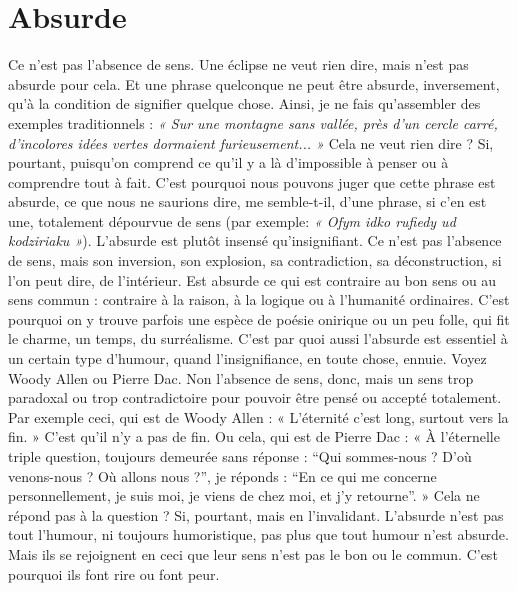 \section{Absurde}
Ce n’est pas l’absence de sens. Une éclipse ne veut rien dire, mais
n'est pas absurde pour cela. Et une phrase quelconque ne peut
être absurde, inversement, qu’à la condition de signifier quelque chose.
Ainsi, je ne fais qu’assembler des exemples traditionnels : {\it « Sur une montagne
sans vallée, près d’un cercle carré, d'incolores idées vertes dormaient
furieusement... »} Cela ne veut rien dire ? Si, pourtant, puisqu'on comprend
ce qu'il y a là d’impossible à penser ou à comprendre tout à fait. C’est pourquoi
nous pouvons juger que cette phrase est absurde, ce que nous ne saurions
dire, me semble-t-il, d’une phrase, si c’en est une, totalement
dépourvue de sens (par exemple: {\it « Ofym idko rufiedy ud kodziriaku »}).
L’absurde est plutôt insensé qu’insignifiant. Ce n’est pas l’absence de sens,
mais son inversion, son explosion, sa contradiction, sa déconstruction, si
l’on peut dire, de l’intérieur. Est absurde ce qui est contraire au bon sens ou
au sens commun : contraire à la raison, à la logique ou à l'humanité ordinaires.
C’est pourquoi on y trouve parfois une espèce de poésie onirique ou
un peu folle, qui fit le charme, un temps, du surréalisme. C’est par quoi
aussi l'absurde est essentiel à un certain type d’humour, quand l’insignifiance,
en toute chose, ennuie. Voyez Woody Allen ou Pierre Dac. Non
l’absence de sens, donc, mais un sens trop paradoxal ou trop contradictoire
pour pouvoir être pensé ou accepté totalement. Par exemple ceci, qui est de
Woody Allen : « L’éternité c’est long, surtout vers la fin. » C’est qu’il n’y a
pas de fin. Ou cela, qui est de Pierre Dac : « À l’éternelle triple question,
toujours demeurée sans réponse : “Qui sommes-nous ? D'où venons-nous ?
Où allons nous ?”, je réponds : “En ce qui me concerne personnellement, je
suis moi, je viens de chez moi, et j'y retourne”. » Cela ne répond pas à la
question ? Si, pourtant, mais en l'invalidant. L’absurde n’est pas tout
l'humour, ni toujours humoristique, pas plus que tout humour n'est
absurde. Mais ils se rejoignent en ceci que leur sens n’est pas le bon ou le
commun. C’est pourquoi ils font rire ou font peur.

